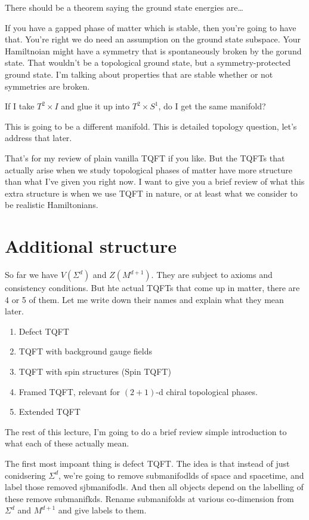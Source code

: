 \begin{question}
    There should be a theorem saying the ground state energies are\ldots
\end{question}
If you have a gapped phase of matter which is stable,
then you're going to have that.
You're right we do need an assumption on the ground state subspace.
Your Hamiltnoian might have a symmetry that is spontaneously broken by the
gorund state.
That wouldn't be a topological ground state,
but a symmetry-protected ground state.
I'm talking about properties that are stable whether or not symmetries are
broken.

\begin{question}
    If I take $T^2\times I$  and glue it up into $T^2\times S^1$,
    do I get the same manifold?
\end{question}
This is going to be a different manifold.
This is detailed topology question,
let's address that later.

That's for my review of plain vanilla TQFT if you like.
But the TQFTs that actually arise when we study topological phases of matter
have more structure than what I've given you right now.
I want to give you a brief review of what this extra structure is
when we use TQFT in nature,
or at least what we consider to be realistic Hamiltonians.

\section{Additional structure}
So far we have $V(\Sigma^d)$ and $Z(M^{d+1})$.
They are subject to axioms and consistency conditions.
But hte actual TQFTs that come up in matter,
there are 4 or 5 of them.
Let me write down their names and explain what they mean later.
\begin{enumerate}
    \item Defect TQFT
    \item TQFT with background gauge fields
    \item TQFT with spin structures (Spin TQFT)
    \item Framed TQFT, relevant for $(2+1)$-d chiral topological phases.
    \item Extended TQFT
\end{enumerate}
The rest of this lecture,
I'm going to do a brief review simple introduction to what each of these
actually mean.

The first most impoant thing is defect TQFT.
The idea is that instead of just conidsering $\Sigma^d$,
we're going to remove submanifodlds of space and spacetime,
and label those removed sjbmanifodls.
And then all objects depend on the labelling of these remove submanifkds.
Rename submanifolds at various co-dimension from
$\Sigma^d$ and $M^{d+1}$ and give labels to them.

